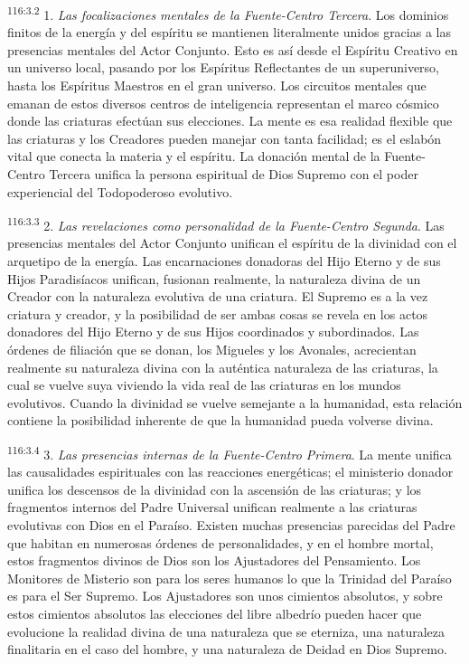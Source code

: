 \par
\textsuperscript{116:3.2} 1. \textit{Las focalizaciones mentales de la Fuente-Centro Tercera}. Los dominios finitos de la energía y del espíritu se mantienen literalmente unidos gracias a las presencias mentales del Actor Conjunto. Esto es así desde el Espíritu Creativo en un universo local, pasando por los Espíritus Reflectantes de un superuniverso, hasta los Espíritus Maestros en el gran universo. Los circuitos mentales que emanan de estos diversos centros de inteligencia representan el marco cósmico donde las criaturas efectúan sus elecciones. La mente es esa realidad flexible que las criaturas y los Creadores pueden manejar con tanta facilidad; es el eslabón vital que conecta la materia y el espíritu. La donación mental de la Fuente-Centro Tercera unifica la persona espiritual de Dios Supremo con el poder experiencial del Todopoderoso evolutivo.

\par
\textsuperscript{116:3.3} 2. \textit{Las revelaciones como personalidad de la Fuente-Centro Segunda}. Las presencias mentales del Actor Conjunto unifican el espíritu de la divinidad con el arquetipo de la energía. Las encarnaciones donadoras del Hijo Eterno y de sus Hijos Paradisíacos unifican, fusionan realmente, la naturaleza divina de un Creador con la naturaleza evolutiva de una criatura. El Supremo es a la vez criatura y creador, y la posibilidad de ser ambas cosas se revela en los actos donadores del Hijo Eterno y de sus Hijos coordinados y subordinados. Las órdenes de filiación que se donan, los Migueles y los Avonales, acrecientan realmente su naturaleza divina con la auténtica naturaleza de las criaturas, la cual se vuelve suya viviendo la vida real de las criaturas en los mundos evolutivos. Cuando la divinidad se vuelve semejante a la humanidad, esta relación contiene la posibilidad inherente de que la humanidad pueda volverse divina.

\par
\textsuperscript{116:3.4} 3. \textit{Las presencias internas de la Fuente-Centro Primera}. La mente unifica las causalidades espirituales con las reacciones energéticas; el ministerio donador unifica los descensos de la divinidad con la ascensión de las criaturas; y los fragmentos internos del Padre Universal unifican realmente a las criaturas evolutivas con Dios en el Paraíso. Existen muchas presencias parecidas del Padre que habitan en numerosas órdenes de personalidades, y en el hombre mortal, estos fragmentos divinos de Dios son los Ajustadores del Pensamiento. Los Monitores de Misterio son para los seres humanos lo que la Trinidad del Paraíso es para el Ser Supremo. Los Ajustadores son unos cimientos absolutos, y sobre estos cimientos absolutos las elecciones del libre albedrío pueden hacer que evolucione la realidad divina de una naturaleza que se eterniza, una naturaleza finalitaria en el caso del hombre, y una naturaleza de Deidad en Dios Supremo.

